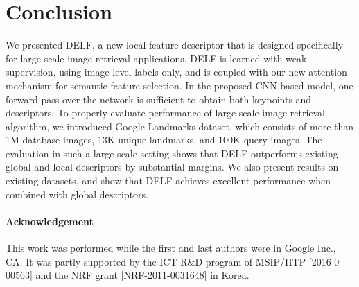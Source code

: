 \documentclass[10pt,twocolumn,letterpaper]{article}
\begin{document}
\section{Conclusion}
We presented DELF, a new local feature descriptor that is designed specifically for large-scale image retrieval applications. DELF is learned with weak supervision, using image-level labels only, and is coupled with our new attention mechanism for semantic feature selection. 
In the proposed CNN-based model, one forward pass over the network is sufficient to obtain both keypoints and descriptors. 
To properly evaluate performance of large-scale image retrieval algorithm, we introduced Google-Landmarks dataset, which consists of more than 1M database images, 13K unique landmarks, and 100K query images. 
The evaluation in such a large-scale setting shows that DELF outperforms existing global and local descriptors by substantial margins. We also present results on existing datasets, and show that DELF achieves excellent performance when combined with global descriptors.
 
\paragraph{Acknowledgement}
This work was performed while the first and last authors were in Google Inc., CA.
It was partly supported by the ICT R\&D program of MSIP/IITP [2016-0-00563] and the NRF grant [NRF-2011-0031648] in Korea.


{\small


}
\end{document}
